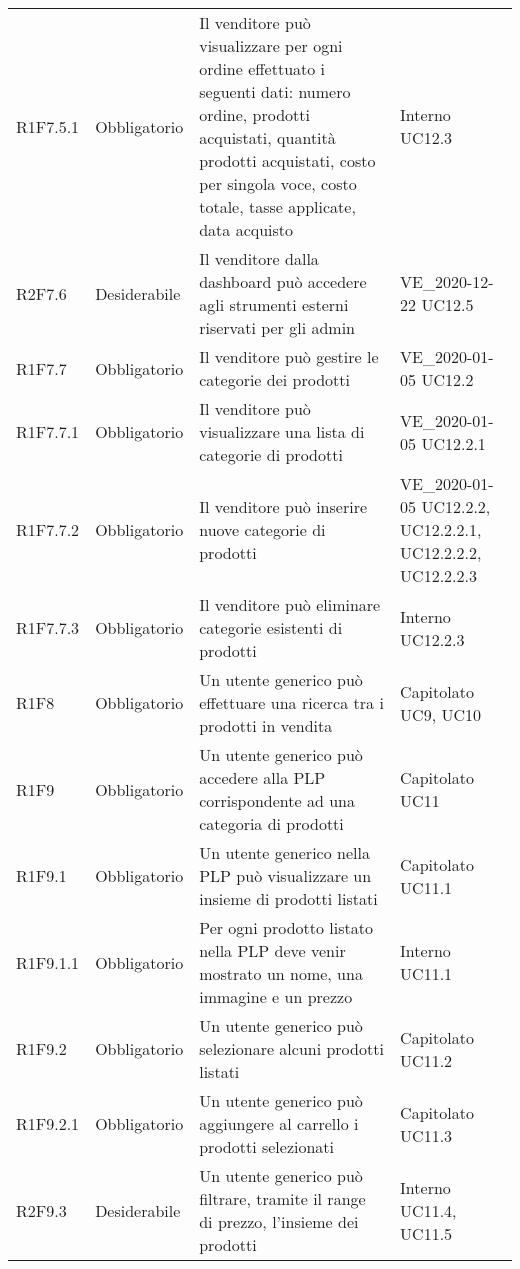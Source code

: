 {\begin{longtable}{C{2.5cm} C{2.8cm} C{6.7cm} C{2.5cm}}
R1F7.5.1 & Obbligatorio & Il venditore può visualizzare per ogni ordine effettuato i seguenti dati: numero ordine, prodotti acquistati, quantità prodotti acquistati, costo per singola voce, costo totale, tasse applicate, data acquisto & Interno \newline UC12.3\\
R2F7.6 & Desiderabile & Il venditore dalla dashboard può accedere agli strumenti esterni riservati per gli admin & VE\_2020-12-22 \newline UC12.5\\
R1F7.7 & Obbligatorio & Il venditore può gestire le categorie dei prodotti & VE\_2020-01-05 \newline UC12.2\\
R1F7.7.1 & Obbligatorio & Il venditore può visualizzare una lista di categorie di prodotti & VE\_2020-01-05 \newline UC12.2.1\\
R1F7.7.2 & Obbligatorio & Il venditore può inserire nuove categorie di prodotti & VE\_2020-01-05 \newline UC12.2.2, UC12.2.2.1, UC12.2.2.2, UC12.2.2.3\\
R1F7.7.3 & Obbligatorio & Il venditore può eliminare categorie esistenti di prodotti & Interno \newline UC12.2.3\\


R1F8 & Obbligatorio & Un utente generico può effettuare una ricerca tra i prodotti in vendita & Capitolato \newline UC9, UC10\\


R1F9 & Obbligatorio & Un utente generico può accedere alla PLP corrispondente ad una categoria di prodotti & Capitolato \newline UC11 \\
R1F9.1 & Obbligatorio & Un utente generico nella PLP può visualizzare un insieme di prodotti listati & Capitolato \newline UC11.1\\
R1F9.1.1 & Obbligatorio & Per ogni prodotto listato nella PLP deve venir mostrato un nome, una immagine e un prezzo & Interno \newline UC11.1\\
R1F9.2 & Obbligatorio & Un utente generico può selezionare alcuni prodotti listati & Capitolato \newline UC11.2\\
R1F9.2.1 & Obbligatorio & Un utente generico può aggiungere al carrello i prodotti selezionati & Capitolato \newline UC11.3\\
R2F9.3 & Desiderabile & Un utente generico può filtrare, tramite il range di prezzo, l'insieme dei prodotti & Interno \newline UC11.4, UC11.5\\


\end{longtable}}
